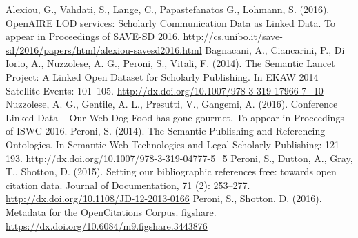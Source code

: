 \documentclass[runningheads,a4paper]{llncs}
\begin{document}
\begin{thebibliography}{4}

 Alexiou, G., Vahdati, S., Lange, C., Papastefanatos G., Lohmann, S. (2016). OpenAIRE LOD services: Scholarly Communication Data as Linked Data. To appear in Proceedings of SAVE-SD 2016. \url{http://cs.unibo.it/save-sd/2016/papers/html/alexiou-savesd2016.html}
 Bagnacani, A., Ciancarini, P., Di Iorio, A., Nuzzolese, A. G., Peroni, S., Vitali, F. (2014). The Semantic Lancet Project: A Linked Open Dataset for Scholarly Publishing. In EKAW 2014 Satellite Events: 101--105. \url{http://dx.doi.org/10.1007/978-3-319-17966-7\_10}
 Nuzzolese, A. G., Gentile, A. L., Presutti, V., Gangemi, A. (2016). Conference Linked Data -- Our Web Dog Food has gone gourmet. To appear in Proceedings of ISWC 2016.
 Peroni, S. (2014). The Semantic Publishing and Referencing Ontologies. In Semantic Web Technologies and Legal Scholarly Publishing: 121--193. \url{http://dx.doi.org/10.1007/978-3-319-04777-5\_5}
 Peroni, S., Dutton, A., Gray, T., Shotton, D. (2015). Setting our bibliographic references free: towards open citation data. Journal of Documentation, 71 (2): 253--277. \url{http://dx.doi.org/10.1108/JD-12-2013-0166}
 Peroni, S., Shotton, D. (2016). Metadata for the OpenCitations Corpus. figshare. \url{https://dx.doi.org/10.6084/m9.figshare.3443876}

\end{thebibliography}
\end{document}
